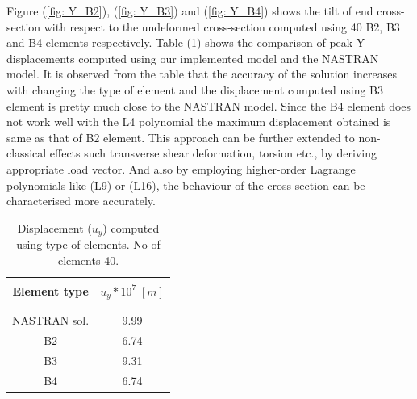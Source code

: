\documentclass[a4paper,12pt]{article}
\begin{document}
Figure (\ref{fig: Y_B2}), (\ref{fig: Y_B3}) and (\ref{fig: Y_B4}) shows the tilt of end cross-section with respect to the undeformed cross-section computed using 40 B2, B3 and B4 elements respectively. Table (\ref{tab:table 8})  shows the comparison of peak Y displacements computed using our implemented model and the NASTRAN model. It is observed from the table that the accuracy of the solution increases with changing the type of element and the displacement computed using B3 element is pretty much close to the NASTRAN model. Since the B4 element does not work well with the L4 polynomial the maximum displacement obtained is same as that of B2 element. This approach can be further extended to non-classical effects such transverse shear deformation, torsion etc., by deriving appropriate load vector. And also by employing higher-order Lagrange polynomials like (L9) or (L16), the behaviour of the cross-section can be characterised more accurately.
\newpage
\begin{table}[h!]
  \begin{center}
     \begin{tabular}{c c}
      \hline\\
      \textbf{Element type} & \textbf{$u_{y}*10^{7}\;[m]$} \\
      \\
      \hline
      \\[-2pt]
       NASTRAN sol. & 9.99 \\[5pt]
       B2 & 6.74\\[5pt]
       B3 & 9.31 \\[5pt]
       B4 & 6.74 \\[5pt]

      \hline
     \end{tabular}
    \caption{Displacement ($u_{y}$) computed  using type of elements. No of elements 40.}
    \label{tab:table 8}
  \end{center}
\end{table}
\end{document}
